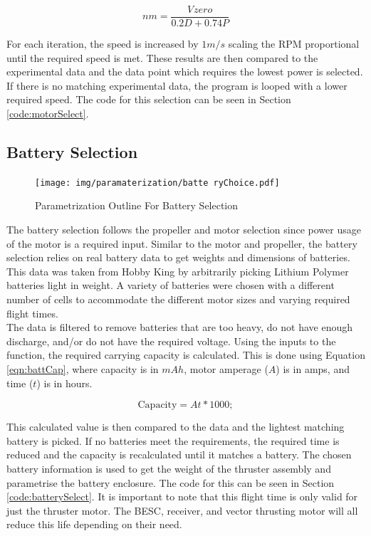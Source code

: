 \documentclass[../main.tex]{subfiles}
\begin{document}
\begin{equation}
nm = \frac{V_{}zero}{0.2D+0.74P}
\end{equation}

For each iteration, the speed is increased by $1m/s$ scaling the RPM proportional until the required speed is met. These results are then compared to the experimental data and the data point which requires the lowest power is selected. If there is no matching experimental data, the program is looped with a lower required speed. The code for this selection can be seen in Section \ref{code:motorSelect}.	

\subsection{Battery Selection} \label{batterySelect}

\begin{figure}[H]
	\centering
	\texttt{[image: img/paramaterization/batte
		ryChoice.pdf]}
	\caption{Parametrization Outline For Battery Selection}
	\label{fig:batteryOutline}
\end{figure}

The battery selection follows the propeller and motor selection since power usage of the motor is a required input. Similar to the motor and propeller, the battery selection relies on real battery data to get weights and dimensions of batteries. This data was taken from Hobby King \cite{Hobbyking}  by arbitrarily picking Lithium Polymer batteries light in weight. A variety of batteries were chosen with a different number of cells to accommodate the different motor sizes and varying required flight times.\\

The data is filtered to remove batteries that are too heavy, do not have enough discharge, and/or do not have the required voltage. Using the inputs to the function, the required carrying capacity is calculated. This is done using Equation \ref{eqn:battCap}, where capacity is in $mAh$, motor amperage ($A$) is in amps, and time ($t$) is in hours.

\begin{equation} \label{eqn:battCap}
\text{Capacity} = At*1000;
\end{equation}

This calculated value is then compared to the data and the lightest matching battery is picked. If no batteries meet the requirements, the required time is reduced and the capacity is recalculated until it matches a battery. The chosen battery information is used to get the weight of the thruster assembly and parametrise the battery enclosure. The code for this can be seen in Section \ref{code:batterySelect}. It is important to note that this flight time is only valid for just the thruster motor. The BESC, receiver, and vector thrusting motor will all reduce this life depending on their need.
\end{document}
